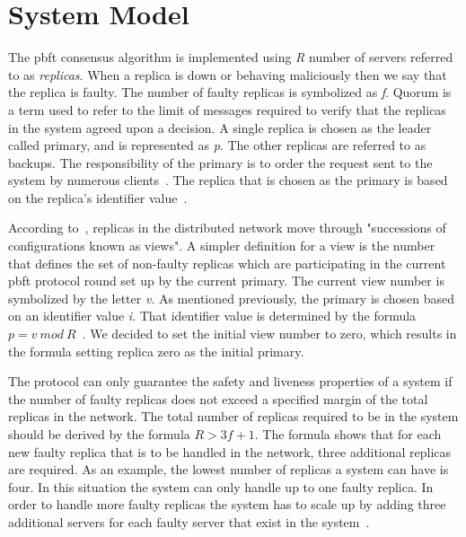 \section{System Model}
\label{sec:systemModel}
The \ac{pbft} consensus algorithm is implemented using \emph{R} number of servers referred to as \emph{replicas}. When a replica is down or behaving maliciously then we say that the replica is faulty. The number of faulty replicas is symbolized as \emph{f}.
Quorum is a term used to refer to the limit of messages required to verify that the replicas in the system agreed upon a decision\cites[p.~408-409]{PAPER:PBFTRecovery}. %
A single replica is chosen as the leader called primary, and is represented as \emph{p}. The other replicas are referred to as backups. The responsibility of the primary is to order the request sent to the system by numerous clients~\cites[p.~456]{BOOK:MVstandver3}[p.~405]{PAPER:PBFTRecovery}. The replica that is chosen as the primary is based on the replica's identifier value~\cite[p.~258]{BOOK:BuildDepDistSyst}.

According to~\cites[p.~3]{PAPER:OGPBFT}[p.~405]{PAPER:PBFTRecovery}, replicas in the distributed network move through "successions of configurations known as views". A simpler definition for a view is the number that defines the set of non-faulty replicas which are participating in the current \ac{pbft} protocol round set up by the current primary. The current view number is symbolized by the letter \emph{v}.
As mentioned previously, the primary is chosen based on an identifier value \emph{i}. That identifier value is determined by the formula $p = v ~mod~ R$~\cites[p.~258]{BOOK:BuildDepDistSyst}[p.~3]{PAPER:OGPBFT}{SLIDES:PBFT}.
We decided to set the initial view number to zero, which results in the formula setting replica zero as the initial primary.

The protocol can only guarantee the safety and liveness properties of a system if the number of faulty replicas does not exceed a specified margin of the total replicas in the network. The total number of replicas required to be in the system should be derived by the formula $R > 3f + 1$.
The formula shows that for each new faulty replica that is to be handled in the network, three additional replicas are required. As an example, the lowest number of replicas a system can have is four. In this situation the system can only handle up to one faulty replica. In order to handle more faulty replicas the system has to scale up by adding three additional servers for each faulty server that exist in the system~\cites[p.~257]{BOOK:BuildDepDistSyst}[p.~403]{PAPER:PBFTRecovery}{SLIDES:PBFT}[p.~3]{PAPER:OGPBFT}.

